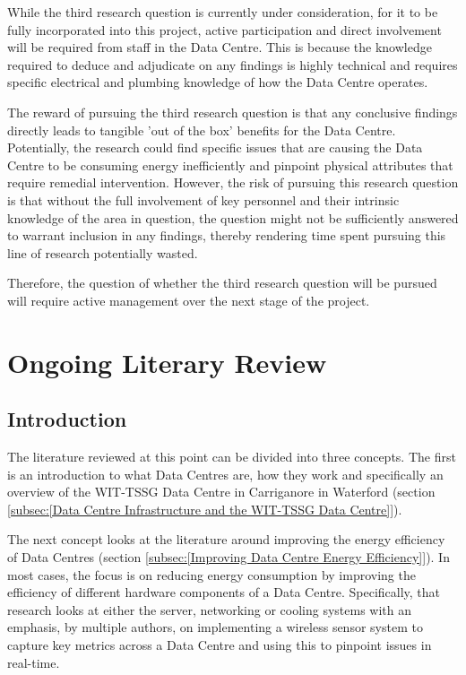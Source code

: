 \documentclass[12pt]{scrartcl}
\begin{document}
While the third research question is currently under consideration, for it to be fully incorporated into this project, active participation and direct involvement will be required from staff in the Data Centre. This is because the knowledge required to deduce and adjudicate on any findings is highly technical and requires specific electrical and plumbing knowledge of how the Data Centre operates. 

The reward of pursuing the third research question is that any conclusive findings directly leads to tangible 'out of the box' benefits for the Data Centre. Potentially, the research could find specific issues that are causing the Data Centre to be consuming energy inefficiently and pinpoint physical attributes that require remedial intervention. However, the risk of pursuing this research question is that without the full involvement of key personnel and their intrinsic knowledge of the area in question, the question might not be sufficiently answered to warrant inclusion in any findings, thereby rendering time spent pursuing this line of research potentially wasted. 

Therefore, the question of whether the third research question will be pursued will require active management over the next stage of the project.      

\section{Ongoing Literary Review}
\label{sec:[Ongoing Literary Review]}

\subsection{Introduction}
\label{subsec:[Introduction]}

The literature reviewed at this point can be divided into three concepts. The first is an introduction to what Data Centres are, how they work and specifically an overview of the WIT-TSSG Data Centre in Carriganore in Waterford (section \ref{subsec:[Data Centre Infrastructure and the WIT-TSSG Data Centre]}).  

The next concept looks at the literature around improving the energy efficiency of Data Centres (section \ref{subsec:[Improving Data Centre Energy Efficiency]}). In most cases, the focus is on reducing energy consumption by improving the efficiency of different hardware components of a Data Centre. Specifically, that research looks at either the server, networking or cooling systems with an emphasis, by multiple authors, on implementing a wireless sensor system to capture key metrics across a Data Centre and using this to pinpoint issues in real-time. 
\end{document}
